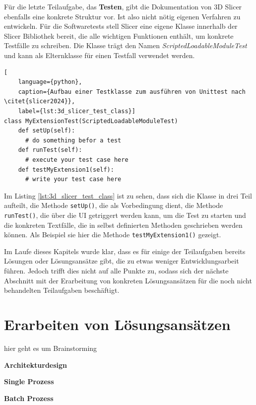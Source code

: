 Für die letzte Teilaufgabe, das \textbf{Testen}, gibt die Dokumentation von 3D Slicer
ebenfalls eine konkrete Struktur vor. Ist also nicht nötig eigenen Verfahren zu
entwickeln. Für die Softwaretests stell Slicer eine eigene Klasse innerhalb der Slicer
Bibliothek bereit, die alle wichtigen Funktionen enthält, um konkrete Testfälle zu
schreiben. Die Klasse trägt den Namen \textsl{ScriptedLoadableModuleTest} und kann
als Elternklasse für einen Testfall verwendet werden.

\begin{lstlisting}[
    language={python},
    caption={Aufbau einer Testklasse zum ausführen von Unittest nach \citet{slicer2024}},
    label={lst:3d_slicer_test_class}]
class MyExtensionTest(ScriptedLoadableModuleTest)
    def setUp(self):
      # do something befor a test
    def runTest(self):
      # execute your test case here
    def testMyExtension1(self):
      # write your test case here
\end{lstlisting}

Im Listing \ref{lst:3d_slicer_test_class} ist zu sehen, dass sich die Klasse in drei
Teil aufteilt, die Methode \texttt{setUp()}, die als Vorbedingung dient, die Methode
\texttt{runTest()}, die über die UI getriggert werden kann, um die Test zu
starten und die konkreten Textfälle, die in selbst definierten Methoden geschrieben
werden können. Als Beispiel sie hier die Methode \texttt{testMyExtension1()} gezeigt.

Im Laufe dieses Kapitels wurde klar, dass es für einige der Teilaufgaben bereits
Lösungen oder Lösungsansätze gibt, die zu etwas weniger Entwicklungsarbeit führen.
Jedoch trifft dies nicht auf alle Punkte zu, sodass sich der nächste Abschnitt mit
der Erarbeitung von konkreten Lösungsansätzen für die noch nicht behandelten Teilaufgaben
beschäftigt.

\section{Erarbeiten von Lösungsansätzen}
\label{sec:lösungsansätze} hier geht es um Brainstorming

\textbf{Architekturdesign}

\textbf{Single Prozess}

\textbf{Batch Prozess}

